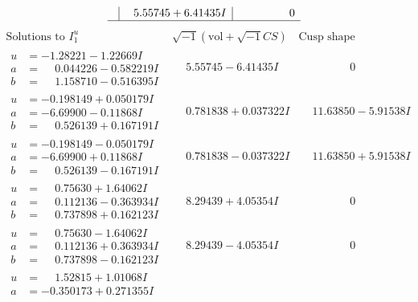 \documentclass[1p]{elsarticle_modified}
\theoremstyle{definition}
\newcommand{\I}{\sqrt{-1}}
\begin{document}
$$\begin{array}{c|c|c}
 & \phantom{-}5.55745 + 6.41435 I & \phantom{-0.000000 } 0\\
 \hline 
 \end{array}$$\newpage$$\begin{array}{c|c|c}  
\text{Solutions to }I^u_{1}& \I (\text{vol} + \sqrt{-1}CS) & \text{Cusp shape}\\
 \hline 
\begin{aligned}
u &= -1.28221 - 1.22669 I \\
a &= \phantom{-}0.044226 - 0.582219 I \\
b &= \phantom{-}1.158710 - 0.516395 I\end{aligned}
 & \phantom{-}5.55745 - 6.41435 I & \phantom{-0.000000 } 0 \\ \hline\begin{aligned}
u &= -0.198149 + 0.050179 I \\
a &= -6.69900 - 0.11868 I \\
b &= \phantom{-}0.526139 + 0.167191 I\end{aligned}
 & \phantom{-}0.781838 + 0.037322 I & \phantom{-}11.63850 - 5.91538 I \\ \hline\begin{aligned}
u &= -0.198149 - 0.050179 I \\
a &= -6.69900 + 0.11868 I \\
b &= \phantom{-}0.526139 - 0.167191 I\end{aligned}
 & \phantom{-}0.781838 - 0.037322 I & \phantom{-}11.63850 + 5.91538 I \\ \hline\begin{aligned}
u &= \phantom{-}0.75630 + 1.64062 I \\
a &= \phantom{-}0.112136 - 0.363934 I \\
b &= \phantom{-}0.737898 + 0.162123 I\end{aligned}
 & \phantom{-}8.29439 + 4.05354 I & \phantom{-0.000000 } 0 \\ \hline\begin{aligned}
u &= \phantom{-}0.75630 - 1.64062 I \\
a &= \phantom{-}0.112136 + 0.363934 I \\
b &= \phantom{-}0.737898 - 0.162123 I\end{aligned}
 & \phantom{-}8.29439 - 4.05354 I & \phantom{-0.000000 } 0 \\ \hline\begin{aligned}
u &= \phantom{-}1.52815 + 1.01068 I \\
a &= -0.350173 + 0.271355 I \\

\end{aligned}
\end{array}$$
\end{document}

